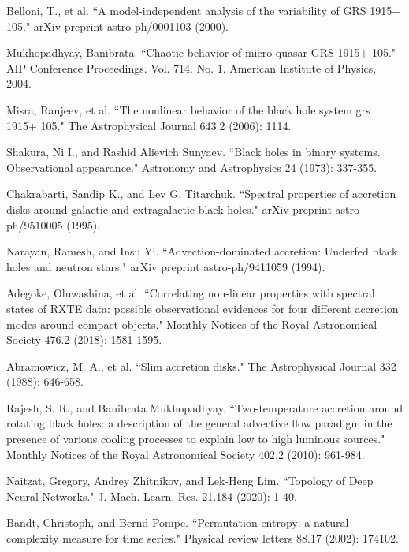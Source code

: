 \documentclass[journal]{IEEEtran}
\begin{document}
	\begin{thebibliography}{1}

Belloni, T., et al. ``A model-independent analysis of the variability of GRS 1915+ 105." arXiv preprint astro-ph/0001103 (2000).

Mukhopadhyay, Banibrata. ``Chaotic behavior of micro quasar GRS 1915+ 105." AIP Conference Proceedings. Vol. 714. No. 1. American Institute of Physics, 2004.

Misra, Ranjeev, et al. ``The nonlinear behavior of the black hole system grs 1915+ 105." The Astrophysical Journal 643.2 (2006): 1114.

Shakura, Ni I., and Rashid Alievich Sunyaev. ``Black holes in binary systems. Observational appearance." Astronomy and Astrophysics 24 (1973): 337-355.

Chakrabarti, Sandip K., and Lev G. Titarchuk. ``Spectral properties of accretion disks around galactic and extragalactic black holes." arXiv preprint astro-ph/9510005 (1995).

Narayan, Ramesh, and Insu Yi. ``Advection-dominated accretion: Underfed black holes and neutron stars." arXiv preprint astro-ph/9411059 (1994).

Adegoke, Oluwashina, et al. ``Correlating non-linear properties with spectral states of RXTE data: possible observational evidences for four different accretion modes around compact objects." Monthly Notices of the Royal Astronomical Society 476.2 (2018): 1581-1595.

Abramowicz, M. A., et al. ``Slim accretion disks." The Astrophysical Journal 332 (1988): 646-658.

Rajesh, S. R., and Banibrata Mukhopadhyay. ``Two-temperature accretion around rotating black holes: a description of the general advective flow paradigm in the presence of various cooling processes to explain low to high luminous sources." Monthly Notices of the Royal Astronomical Society 402.2 (2010): 961-984.

Naitzat, Gregory, Andrey Zhitnikov, and Lek-Heng Lim. ``Topology of Deep Neural Networks." J. Mach. Learn. Res. 21.184 (2020): 1-40.

Bandt, Christoph, and Bernd Pompe. ``Permutation entropy: a natural complexity measure for time series." Physical review letters 88.17 (2002): 174102.


\end{thebibliography}
\end{document}
